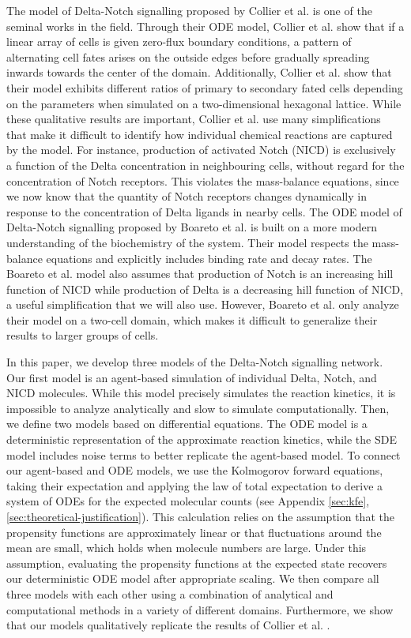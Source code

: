 \documentclass{article}
\begin{document}
The model of Delta-Notch signalling proposed by Collier et al. \cite{collier_pattern_1996} is one of the seminal works in the field.
Through their ODE model, Collier et al. show that if a linear array of cells is given zero-flux boundary conditions, a pattern of alternating cell fates arises on the outside edges before gradually spreading inwards towards the center of the domain.
Additionally, Collier et al. show that their model exhibits different ratios of primary to secondary fated cells depending on the parameters when simulated on a two-dimensional hexagonal lattice. 
While these qualitative results are important, Collier et al. use many simplifications that make it difficult to identify how individual chemical reactions are captured by the model.
For instance, production of activated Notch (NICD) is exclusively a function of the Delta concentration in neighbouring cells, without regard for the concentration of Notch receptors.
This violates the mass-balance equations, since we now know that the quantity of Notch receptors changes dynamically in response to the concentration of Delta ligands in nearby cells.
The ODE model of Delta-Notch signalling proposed by Boareto et al. \cite{boareto_jaggeddelta_2015} is built on a more modern understanding of the biochemistry of the system.
Their model respects the mass-balance equations and explicitly includes binding rate and decay rates. 
The Boareto et al. model also assumes that production of Notch is an increasing hill function of NICD while production of Delta is a decreasing hill function of NICD, a useful simplification that we will also use.
However, Boareto et al. \cite{boareto_jaggeddelta_2015} only analyze their model on a two-cell domain, which makes it difficult to generalize their results to larger groups of cells.

In this paper, we develop three models of the Delta-Notch signalling network. 
Our first model is an agent-based simulation of individual Delta, Notch, and NICD molecules. 
While this model precisely simulates the reaction kinetics, it is impossible to analyze analytically and slow to simulate computationally.
Then, we define two models based on differential equations.
The ODE model is a deterministic representation of the approximate reaction kinetics, while the SDE model includes noise terms to better replicate the agent-based model.
To connect our agent-based and ODE models, we use the Kolmogorov forward equations, taking their expectation and applying the law of total expectation to derive a system of ODEs for the expected molecular counts (see Appendix \ref{sec:kfe}, \ref{sec:theoretical-justification}).
This calculation relies on the assumption that the propensity functions are approximately linear or that fluctuations around the mean are small, which holds when molecule numbers are large.
Under this assumption, evaluating the propensity functions at the expected state recovers our deterministic ODE model after appropriate scaling.
We then compare all three models with each other using a combination of analytical and computational methods in a variety of different domains.
Furthermore, we show that our models qualitatively replicate the results of Collier et al. \cite{collier_pattern_1996}. 
\end{document}
